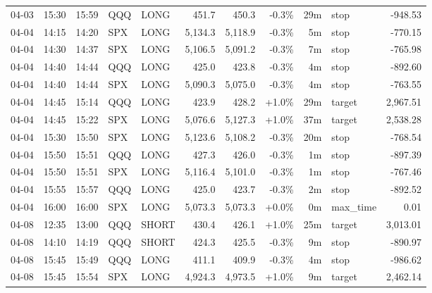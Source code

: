 \documentclass[11pt,a4paper,twoside]{article}
\begin{document}
\begin{center}
\begin{longtable}{>{\color{txtmain}}l l l l l r r r r >{\color{txtmain}}l r}
04-03 & 15:30 & 15:59 & QQQ & LONG & 451.7 & 450.3 & \textcolor{lossred}{-0.3\%} & 29m & stop & \textcolor{lossred}{-948.53} \\
04-04 & 14:15 & 14:20 & SPX & LONG & 5,134.3 & 5,118.9 & \textcolor{lossred}{-0.3\%} & 5m & stop & \textcolor{lossred}{-770.15} \\
04-04 & 14:30 & 14:37 & SPX & LONG & 5,106.5 & 5,091.2 & \textcolor{lossred}{-0.3\%} & 7m & stop & \textcolor{lossred}{-765.98} \\
04-04 & 14:40 & 14:44 & QQQ & LONG & 425.0 & 423.8 & \textcolor{lossred}{-0.3\%} & 4m & stop & \textcolor{lossred}{-892.60} \\
04-04 & 14:40 & 14:44 & SPX & LONG & 5,090.3 & 5,075.0 & \textcolor{lossred}{-0.3\%} & 4m & stop & \textcolor{lossred}{-763.55} \\
04-04 & 14:45 & 15:14 & QQQ & LONG & 423.9 & 428.2 & \textcolor{wingreen}{+1.0\%} & 29m & target & \textcolor{wingreen}{2,967.51} \\
04-04 & 14:45 & 15:22 & SPX & LONG & 5,076.6 & 5,127.3 & \textcolor{wingreen}{+1.0\%} & 37m & target & \textcolor{wingreen}{2,538.28} \\
04-04 & 15:30 & 15:50 & SPX & LONG & 5,123.6 & 5,108.2 & \textcolor{lossred}{-0.3\%} & 20m & stop & \textcolor{lossred}{-768.54} \\
04-04 & 15:50 & 15:51 & QQQ & LONG & 427.3 & 426.0 & \textcolor{lossred}{-0.3\%} & 1m & stop & \textcolor{lossred}{-897.39} \\
04-04 & 15:50 & 15:51 & SPX & LONG & 5,116.4 & 5,101.0 & \textcolor{lossred}{-0.3\%} & 1m & stop & \textcolor{lossred}{-767.46} \\
04-04 & 15:55 & 15:57 & QQQ & LONG & 425.0 & 423.7 & \textcolor{lossred}{-0.3\%} & 2m & stop & \textcolor{lossred}{-892.52} \\
04-04 & 16:00 & 16:00 & SPX & LONG & 5,073.3 & 5,073.3 & \textcolor{wingreen}{+0.0\%} & 0m & max\_time & \textcolor{wingreen}{0.01} \\
04-08 & 12:35 & 13:00 & QQQ & SHORT & 430.4 & 426.1 & \textcolor{wingreen}{+1.0\%} & 25m & target & \textcolor{wingreen}{3,013.01} \\
04-08 & 14:10 & 14:19 & QQQ & SHORT & 424.3 & 425.5 & \textcolor{lossred}{-0.3\%} & 9m & stop & \textcolor{lossred}{-890.97} \\
04-08 & 15:45 & 15:49 & QQQ & LONG & 411.1 & 409.9 & \textcolor{lossred}{-0.3\%} & 4m & stop & \textcolor{lossred}{-986.62} \\
04-08 & 15:45 & 15:54 & SPX & LONG & 4,924.3 & 4,973.5 & \textcolor{wingreen}{+1.0\%} & 9m & target & \textcolor{wingreen}{2,462.14} \\

\end{longtable}
\end{center}
\end{document}
